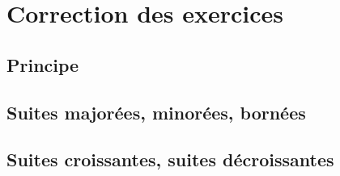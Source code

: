 \documentclass[11pt,fleqn]{book} %
\begin{document}

\chapter{Correction des exercices}
\section*{Principe}
\printsolutions[collection={rec01}, headings={false} ]

\section*{Suites majorées, minorées, bornées}
\printsolutions[collection={rec02}, headings={false} ]

\section*{Suites croissantes, suites décroissantes}

\printsolutions[collection={rec03}, headings={false} ]
\end{document}
